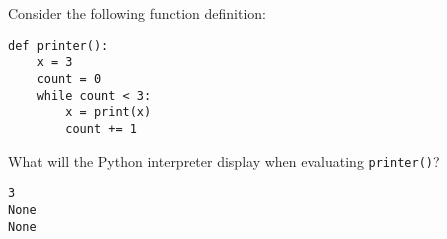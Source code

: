 \begin{blocksection}
\question 
Consider the following function definition:
\begin{lstlisting}
def printer():
	x = 3
	count = 0
	while count < 3:
		x = print(x)
		count += 1
\end{lstlisting}

What will the Python interpreter display when
evaluating \lstinline{printer()}?

\begin{solution}[0.5in]
\begin{verbatim}
3
None
None
\end{verbatim}
\end{solution}
\end{blocksection}
